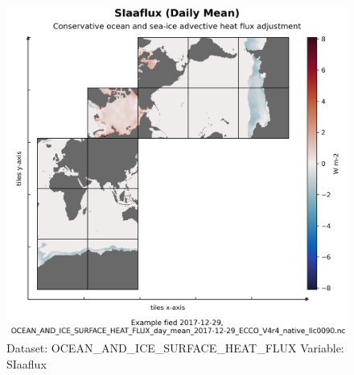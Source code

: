 \begin{figure}[H]
\centering
\includegraphics[scale=0.55]{../images/plots/native_plots/Ocean_and_Sea-Ice_Surface_Heat_Fluxes/SIaaflux.png}
\caption{Dataset: OCEAN\_AND\_ICE\_SURFACE\_HEAT\_FLUX Variable: SIaaflux}
\label{tab:table-OCEAN_AND_ICE_SURFACE_HEAT_FLUX_SIaaflux-Plot}
\end{figure}
\pagebreak
